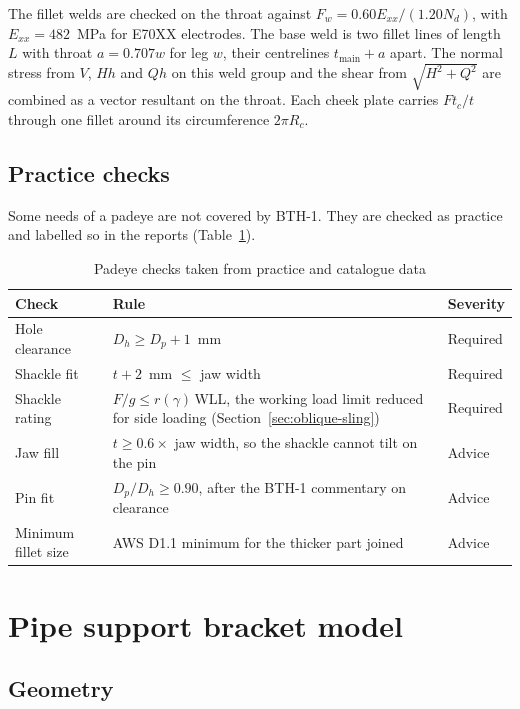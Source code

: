 The fillet welds are checked on the throat against
$F_w = 0.60E_{xx}/(1.20N_d)$, with $E_{xx} = 482$~MPa for E70XX electrodes.
The base weld is two fillet lines of length $L$ with throat $a = 0.707w$ for
leg $w$, their centrelines $t_\text{main} + a$ apart. The normal stress from
$V$, $Hh$ and $Qh$ on this weld group and the shear from $\sqrt{H^2+Q^2}$ are
combined as a vector resultant on the throat. Each cheek plate carries
$F t_c/t$ through one fillet around its circumference $2\pi R_c$.

\subsection{Practice checks}

Some needs of a padeye are not covered by BTH-1. They are checked as
\NEMO{} practice and labelled so in the reports
(Table~\ref{tab:padeye-practice}).

\begin{table}[H]
\centering
\caption{Padeye checks taken from practice and catalogue data}
\label{tab:padeye-practice}
\small
\begin{tabularx}{\textwidth}{lXl}
\toprule
\textbf{Check} & \textbf{Rule} & \textbf{Severity}\\
\midrule
Hole clearance & $D_h \geq D_p + 1$~mm & Required\\
Shackle fit & $t + 2$~mm $\leq$ jaw width & Required\\
Shackle rating & $F/g \leq r(\gamma)\,$WLL, the working load limit reduced for side loading (Section~\ref{sec:oblique-sling}) \cite{crosby2019,crosbySideLoad} & Required\\
Jaw fill & $t \geq 0.6 \times$ jaw width, so the shackle cannot tilt on the pin & Advice\\
Pin fit & $D_p/D_h \geq 0.90$, after the BTH-1 commentary on clearance & Advice\\
Minimum fillet size & AWS D1.1 minimum for the thicker part joined \cite{awsD11} & Advice\\
\bottomrule
\end{tabularx}
\end{table}

\section{Pipe support bracket model}
\label{sec:bracket-model}

\subsection{Geometry}

